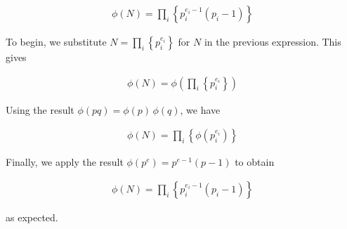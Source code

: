 \documentclass[../CryptoFinal.tex]{subfiles}
\begin{document}
\begin{flushleft}
\begin{align*}
  \phi \left( N \right) = \prod_i \left\{ p_i^{e_i - 1} \left( p_i - 1 \right) \right\}
\end{align*}

To begin, we substitute $N = \prod_i \left\{ p_i^{e_i} \right\}$ for $N$ in the previous expression.  This gives

\begin{align*}
  \phi \left( N \right) = \phi \left( \prod_i \left\{ p_i^{e_i} \right\} \right)
\end{align*}

Using the result $\phi \left( p q \right) = \phi \left( p \right) \, \phi \left( q \right)$, we have

\begin{align*}
  \phi \left( N \right) = \prod_i \left\{ \phi \left( p_i^{e_i} \right) \right\}
\end{align*}

Finally, we apply the result $\phi \left( p^e \right) = p^{e-1} \left( p - 1 \right)$ to obtain 

\begin{align*}
  \phi \left( N \right) = \prod_i \left\{ p_i^{e_i - 1} \left( p_i - 1 \right) \right\}
\end{align*}

as expected.



\end{flushleft}
\end{document}
